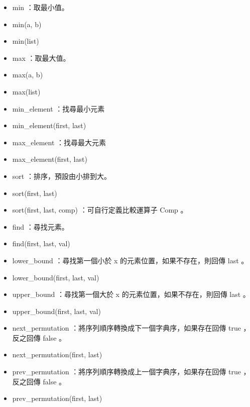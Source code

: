 \begin{itemize}
\item min ：取最小值。
\item min(a, b)
\item min(list)
\item max ：取最大值。
\item max(a, b)
\item max(list)
\item min\_element ：找尋最小元素
\item min\_element(first, last)
\item max\_element ：找尋最大元素
\item max\_element(first, last)
\item sort ：排序，預設由小排到大。
\item sort(first, last)
\item sort(first, last, comp) ：可自行定義比較運算子 Comp 。
\item find ：尋找元素。
\item find(first, last, val)
\item lower\_bound ：尋找第一個小於 x 的元素位置，如果不存在，則回傳 last 。
\item lower\_bound(first, last, val)
\item upper\_bound ：尋找第一個大於 x 的元素位置，如果不存在，則回傳 last 。
\item upper\_bound(first, last, val)
\item next\_permutation ：將序列順序轉換成下一個字典序，如果存在回傳 true ，反之回傳 false 。
\item next\_permutation(first, last)
\item prev\_permutation ：將序列順序轉換成上一個字典序，如果存在回傳 true ，反之回傳 false 。
\item prev\_permutation(first, last)
\end{itemize}